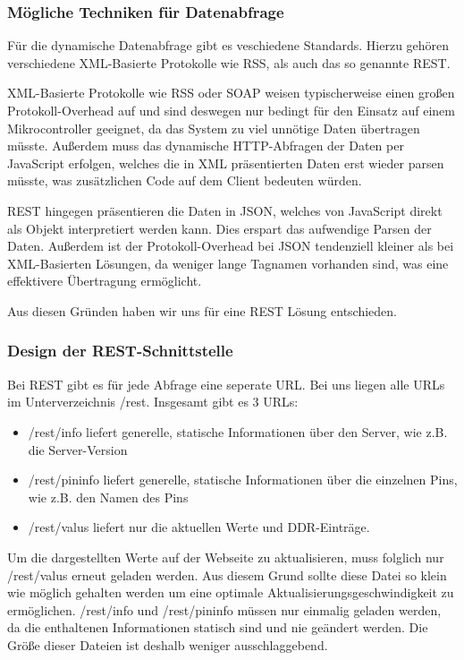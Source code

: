\subsubsection{Mögliche Techniken für Datenabfrage}

Für die dynamische Datenabfrage gibt es veschiedene Standards. Hierzu gehören
verschiedene \ac{XML}-Basierte Protokolle wie RSS, als auch das so genannte
\ac{REST}.

\ac{XML}-Basierte Protokolle wie \ac{RSS} oder \ac{SOAP} weisen typischerweise
einen großen Protokoll-Overhead auf und sind deswegen nur bedingt für den Einsatz auf einem
Mikrocontroller geeignet, da das System zu viel unnötige Daten übertragen
müsste. Außerdem muss das dynamische \ac{HTTP}-Abfragen der Daten per JavaScript
erfolgen, welches die in \ac{XML} präsentierten Daten erst wieder parsen müsste, was
zusätzlichen Code auf dem Client bedeuten würden.

\ac{REST} hingegen präsentieren die Daten in \ac{JSON}, welches von
JavaScript direkt als Objekt interpretiert werden kann. Dies erspart das
aufwendige Parsen der Daten. Außerdem ist der Protokoll-Overhead bei \ac{JSON}
tendenziell kleiner als bei \ac{XML}-Basierten Lösungen, da weniger lange Tagnamen
vorhanden sind, was eine effektivere Übertragung ermöglicht.

Aus diesen Gründen haben wir uns für eine \ac{REST} Lösung entschieden.

\subsubsection{Design der REST-Schnittstelle}
Bei \ac{REST} gibt es für jede Abfrage eine seperate \ac{URL}. Bei uns liegen
alle URLs im Unterverzeichnis \textrm{/rest}. Insgesamt gibt es 3 URLs:
\begin{itemize}
  \item  \textrm{/rest/info} liefert generelle, statische Informationen über den
  Server, wie z.B. die Server-Version
  \item  \textrm{/rest/pininfo} liefert generelle, statische Informationen über
  die einzelnen Pins, wie z.B. den Namen des Pins
  \item  \textrm{/rest/valus} liefert nur die aktuellen Werte und
  \ac{DDR}-Einträge.
\end{itemize}

Um die dargestellten Werte auf der Webseite zu aktualisieren, muss folglich nur
\textrm{/rest/valus} erneut geladen werden. Aus diesem Grund sollte diese
Datei so klein wie möglich gehalten werden um eine optimale
Aktualisierungsgeschwindigkeit zu ermöglichen. \textrm{/rest/info} und  
\textrm{/rest/pininfo} müssen nur einmalig geladen werden, da die enthaltenen
Informationen statisch sind und nie geändert werden. Die Größe dieser Dateien
ist deshalb weniger ausschlaggebend.
